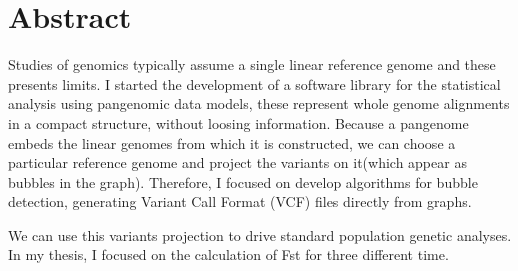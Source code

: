 
\chapter{Abstract} %
    

\label{Chapter0} %


\newcommand{\keyword}[1]{\textbf{#1}}
\newcommand{\tabhead}[1]{\textbf{#1}}
\newcommand{\code}[1]{\texttt{#1}}
\newcommand{\file}[1]{\texttt{\bfseries#1}}
\newcommand{\option}[1]{\texttt{\itshape#1}}

Studies of genomics typically assume a single linear reference genome and these presents limits. I started the development of a software library for the statistical analysis using pangenomic data models, these represent whole genome alignments in a compact structure, without loosing information. Because a pangenome embeds the linear genomes from which it is constructed, we can choose a particular reference genome and project the variants on it(which appear as bubbles in the graph). Therefore, I focused on develop algorithms for bubble detection, generating Variant Call Format (VCF) files directly from graphs.

\noindent
We can use this variants projection to drive standard population genetic analyses. In my thesis, I focused on the calculation of Fst for three different time.

